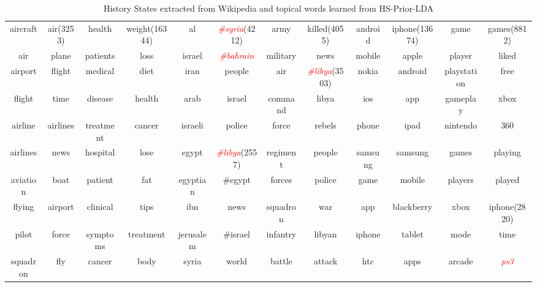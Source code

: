 \documentclass{article}
\begin{document}
\begin{table}[ht]
{\begin{tabular}{|cc|cc|cc|cc|cc|cc|}
\hline
aircraft & air\scriptsize(3253) & health & weight\scriptsize(16344) & al & \textcolor{red}{\textit{\#syria}}\scriptsize(4212) & army & killed\scriptsize(4055)  & android & iphone\scriptsize (13674) & game & games\scriptsize(8812) \\ 
air & plane & patients & loss & israel & \textcolor{red}{\textit{\#bahrain}} & military & news & mobile & apple & player & liked \\ 
airport & flight & medical & diet & iran & people & air & \textcolor{red}{\textit{\#libya}}\scriptsize(3503) & nokia & android & playstation & free \\ 
flight & time & disease & health & arab & israel & command & libya & ios & app & gameplay & xbox \\
airline & airlines & treatment & cancer & israeli & police & force & rebels & phone & ipad & nintendo & 360 \\
airlines & news & hospital & lose & egypt & \textcolor{red}{\textit{\#libya}}\scriptsize(2557) & regiment & people & samsung & samsung & games & playing \\
aviation & boat & patient & fat & egyptian & \#egypt & forces & police & game & mobile & players & played \\
flying & airport & clinical & tips & ibn & news & squadron & war & app & blackberry & xbox &iphone\scriptsize(2820)\\
pilot & force & symptoms & treatment & jerusalem & \#israel & infantry & libyan & iphone & tablet & mode & time\\
squadron & fly & cancer & body & syria & world & battle & attack & htc & apps & arcade & \textcolor{red}{\textit{ps3}}\\
\hline
\end{tabular}
}
\caption{History States extracted from Wikipedia and topical words learned from HS-Prior-LDA}
\label{tbl:historyStates}
\end{table}
\end{document}
